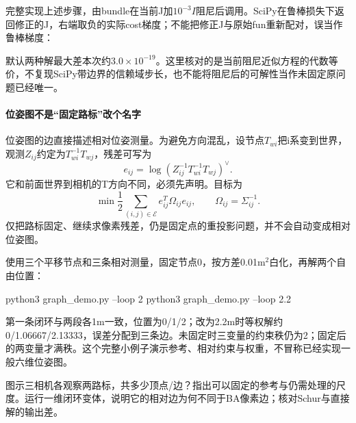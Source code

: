 \begin{example}[对同一方程比较直接解与消元]
完整实现上述步骤，由bundle在当前J加$10^{-3}I$阻尼后调用。SciPy在鲁棒损失下返回修正的J，右端取负的实际cost梯度；不能把修正J与原始fun重新配对，误当作鲁棒梯度：
\par\smallskip\noindent\begin{minipage}{\linewidth}

\end{minipage}\par
默认两种解最大差本次约$3.0\times10^{-19}$。这里核对的是当前阻尼近似方程的代数等价，不复现SciPy带边界的信赖域步长，也不能将阻尼后的可解性当作未固定原问题已经唯一。
\end{example}

\paragraph*{位姿图不是“固定路标”改个名字}
位姿图的边直接描述相对位姿测量。为避免方向混乱，设节点$T_{wi}$把i系变到世界，观测$Z_{ij}$约定为$T_{wi}^{-1}T_{wj}$，残差可写为
\[
e_{ij}=\log(Z_{ij}^{-1}T_{wi}^{-1}T_{wj})^\vee.
\]
它和前面世界到相机的T方向不同，必须先声明。目标为
\begin{equation}
\min\frac12\sum_{(i,j)\in\mathcal E} e_{ij}^T\Omega_{ij}e_{ij},
\qquad \Omega_{ij}=\Sigma_{ij}^{-1}.
\label{eq:pose_graph_cost}
\end{equation}
仅把路标固定、继续求像素残差，仍是固定点的重投影问题，并不会自动变成相对位姿图。

\begin{example}[先在一维平移子问题里看闭环]
使用三个平移节点和三条相对测量，固定节点0，按方差0.01m$^2$白化，再解两个自由位置：

\begin{tbash}
python3 graph_demo.py --loop 2
python3 graph_demo.py --loop 2.2
\end{tbash}
第一条闭环与两段各1m一致，位置为0/1/2；改为2.2m时等权解约0/1.06667/2.13333，误差分配到三条边。未固定时三变量的约束秩仍为2；固定后的两变量才满秩。这个完整小例子演示参考、相对约束与权重，不冒称已经实现一般六维位姿图。
\end{example}
\begin{exercise}\label{ex:v2-ba-graph}
图示三相机各观察两路标，共多少顶点/边？指出可以固定的参考与仍需处理的尺度。运行一维闭环变体，说明它的相对边为何不同于BA像素边；核对Schur与直接解的输出差。
\end{exercise}

